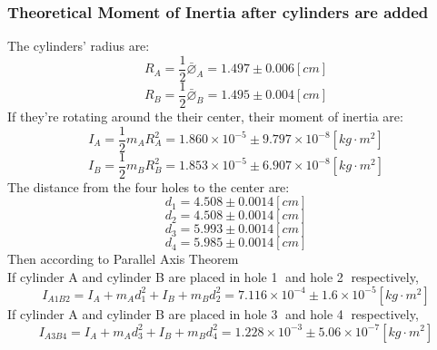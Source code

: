 \documentclass[12pt]{article}
\begin{document}
\subsubsection{Theoretical Moment of Inertia after cylinders are added}
The cylinders' radius are:
$$R_{A}=\frac{1}{2}\bar{\varnothing}_{A}=1.497\pm0.006[cm]$$
$$R_{B}=\frac{1}{2}\bar{\varnothing}_{B}=1.495\pm0.004[cm]$$
If they're rotating around the their center, their moment of inertia are:
$$I_{A}=\frac{1}{2}m_{A}R^2_{A}=1.860\times10^{-5}\pm9.797\times10^{-8}[kg\cdot{m^2}]$$
$$I_{B}=\frac{1}{2}m_{B}R^2_{B}=1.853\times10^{-5}\pm6.907\times10^{-8}[kg\cdot{m^2}]$$
The distance from the four holes to the center are:\\
$$d_1=4.508\pm0.0014[cm]$$
$$d_2=4.508\pm0.0014[cm]$$
$$d_3=5.993\pm0.0014[cm]$$
$$d_4=5.985\pm0.0014[cm]$$
Then according to Parallel Axis Theorem\\
If cylinder A and cylinder B are placed in hole \textcircled{1} and hole \textcircled{2} respectively,
$$I_{A1B2}=I_A+m_Ad_1^2+I_B+m_Bd_2^2=7.116\times10^{-4}\pm1.6\times10^{-5}[kg\cdot{m^2}]$$
If cylinder A and cylinder B are placed in hole \textcircled{3} and hole \textcircled{4} respectively,
$$I_{A3B4}=I_A+m_Ad_3^2+I_B+m_Bd_4^2=1.228\times10^{-3}\pm5.06\times10^{-7}[kg\cdot{m^2}]$$
\end{document}

